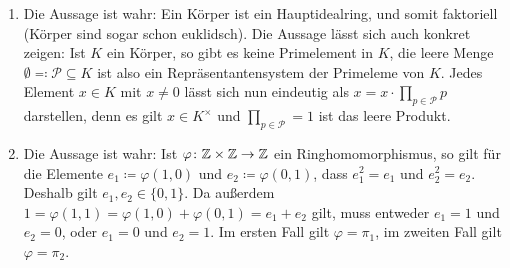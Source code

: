 \begin{solution}
  \begin{enumerate}
    \item
      Die Aussage ist wahr:
      Ein Körper ist ein Hauptidealring, und somit faktoriell (Körper sind sogar schon euklidsch).
      Die Aussage lässt sich auch konkret zeigen:
      Ist $K$ ein Körper, so gibt es keine Primelement in $K$, die leere Menge $\emptyset \eqqcolon \mathcal{P} \subseteq K$ ist also ein Repräsentantensystem der Primeleme von $K$.
      Jedes Element $x \in K$ mit $x \neq 0$ lässt sich nun eindeutig als $x = x \cdot \prod_{p \in \mathcal{P}} p$ darstellen, denn es gilt $x \in K^\times$ und $\prod_{p \in \mathcal{P}} = 1$ ist das leere Produkt.
    \item
      Die Aussage ist wahr:
      Ist $\varphi \colon \mathbb{Z} \times \mathbb{Z} \to \mathbb{Z}$ ein Ringhomomorphismus, so gilt für die Elemente $e_1 \coloneqq \varphi(1,0)$ und $e_2 \coloneqq \varphi(0,1)$, dass $e_1^2 = e_1$ und $e_2^2 = e_2$.
      Deshalb gilt $e_1, e_2 \in \{0,1\}$.
      Da außerdem $1 = \varphi(1,1) = \varphi(1,0) + \varphi(0,1) = e_1 + e_2$ gilt, muss entweder $e_1 = 1$ und $e_2 = 0$, oder $e_1 = 0$ und $e_2 = 1$.
      Im ersten Fall gilt $\varphi = \pi_1$, im zweiten Fall gilt $\varphi = \pi_2$.
      

\end{enumerate}
\end{solution}
